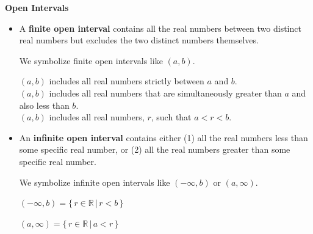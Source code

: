 \documentclass{ximera}
\begin{document}
\begin{idea} \textbf{\textcolor{blue!55!black}{Open Intervals}} 



\begin{itemize}
\item A \textbf{finite open interval} contains all the real numbers between two distinct real numbers but excludes the two distinct numbers themselves.

We symbolize finite open intervals like $(a, b)$. 

$(a,b)$ includes all real numbers strictly between $a$ and $b$. \\
$(a,b)$ includes all real numbers that are simultaneously greater than $a$ and also less than $b$.  \\
$(a,b)$ includes all real numbers, $r$, such that $a < r < b$.



\item An \textbf{infinite open interval} contains either (1) all the real numbers less than some specific real number, or (2) all the real numbers greater than some specific real number. 

We symbolize infinite open intervals like $(-\infty, b)$ or $(a, \infty)$. 

$(-\infty, b) = \{ \, r \in \mathbb{R} \, | \,  r < b   \,  \}$

$(a, \infty) = \{ \, r \in \mathbb{R} \, | \,  a < r   \,  \}$

\end{itemize}

\end{idea}
\end{document}
